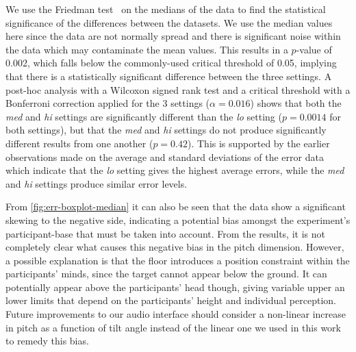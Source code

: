 \documentclass[sigconf, review=true, screen=true, anonymous=true]{acmart}
\begin{document}
We use the Friedman test~\cite{friedman1937use} on the medians of the data to find the statistical significance of the differences between the datasets.
We use the median values here since the data are not normally spread and there is significant noise within the data which may contaminate the mean values.
This results in a $p$-value of 0.002, which falls below the commonly-used critical threshold of 0.05, implying that there is a statistically significant difference between the three settings.
A post-hoc analysis with a Wilcoxon signed rank test and a critical threshold with a Bonferroni correction applied for the 3 settings ($\alpha=0.016$) shows that both the \emph{med} and \emph{hi} settings are significantly different than the \emph{lo} setting ($p=0.0014$ for both settings), but that the \emph{med} and \emph{hi} settings do not produce significantly different results from one another ($p=0.42$).
This is supported by the earlier observations made on the average and standard deviations of the error data which indicate that the \emph{lo} setting gives the highest average errors, while the \emph{med} and \emph{hi} settings produce similar error levels. 

From \cref{fig:err-boxplot-median} it can also be seen that the data show a significant skewing to the negative side, indicating a potential bias amongst the experiment's participant-base that must be taken into account.
From the results, it is not completely clear what causes this negative bias in the pitch dimension.
However, a possible explanation is that the floor introduces a position constraint within the participants' minds, since the target cannot appear below the ground.
It can potentially appear above the participants' head though, giving variable upper an lower limits that depend on the participants' height and individual perception.
Future improvements to our audio interface should consider a non-linear increase in pitch as a function of tilt angle instead of the linear one we used in this work to remedy this bias.

\end{document}
